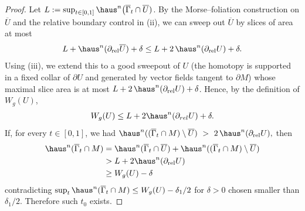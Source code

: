 \begin{proof}
    Let $L:=\sup_{t\in[0,1]}\haus^n\bigl(\overline{\Gamma}_t\cap \overline U)$. By the Morse–foliation construction on $\overline U$ and the relative boundary control in (ii), we can sweep out $\overline U$
    by slices of area at most
\begin{equation*}
  L+\haus^n(\partial_{\mathrm{rel}}\overline U)+\delta \le L+2\,\haus^n(\partial_{\mathrm{rel}}U)+\delta.
\end{equation*}
Using (iii), we extend this to a good sweepout of $U$ (the homotopy is supported in a fixed collar of $\partial U$ and generated by vector fields tangent to $\partial M$) whose maximal slice area is at most $L+2\,\haus^n(\partial_{\mathrm{rel}}U)+\delta$. Hence, by the definition of $W_g(U)$,
\begin{equation*}
  W_g(U)\le L+2\haus^n(\partial_{rel}U)+\delta.
\end{equation*}
If, for every $t\in[0,1]$, we had $\haus^n((\overline{\Gamma}_t\cap M)\setminus \overline U)\ >\ 2\,\haus^n(\partial_{\mathrm{rel}}U),$
then
\begin{equation*}
    \begin{split}
        \haus^n(\overline{\Gamma}_t\cap M) &= \haus^n(\overline{\Gamma}_t\cap \overline U) + \haus^n( (\overline{\Gamma}_t\cap M)\setminus \overline U)\\
        &> L + 2\haus^n(\partial_{\mathrm{rel}}U)\\
        &\geq W_g(U)-\delta
    \end{split}
\end{equation*}
contradicting $\sup_t\haus^n(\overline{\Gamma}_t\cap M)\le W_g(U)-\delta_1/2$ for $\delta>0$ chosen smaller than $\delta_1/2$.
Therefore such $t_0$ exists.
\end{proof}

